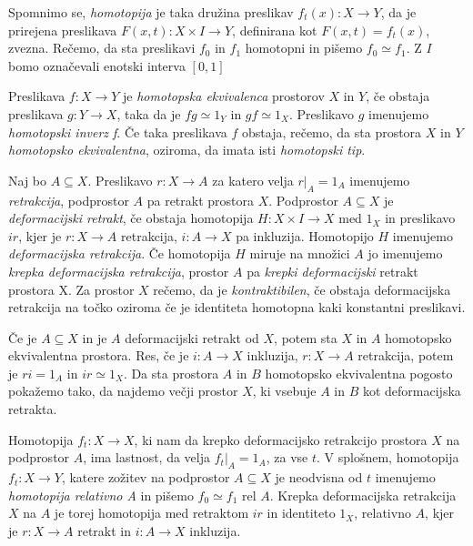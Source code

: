 \documentclass[mat1]{fmfdelo}
\begin{document}
Spomnimo se, \textit{homotopija} je taka družina preslikav $f_t(x)\colon X \rightarrow Y$, da je prirejena preslikava $F(x,t)\colon X \times I \rightarrow Y$, definirana kot $F(x,t)=f_t(x)$, zvezna. Rečemo, da sta preslikavi $f_0$ in $f_1$ homotopni in pišemo $f_0 \simeq f_1$. Z $I$ bomo označevali enotski interva $[0,1]$


\begin{definicija}
    Preslikava  $f \colon  X \rightarrow Y$ je \textit{homotopska ekvivalenca} prostorov $X$ in $Y$, če obstaja preslikava $g\colon  Y\rightarrow X$, taka da
    je $f g \simeq 1_Y$ in $gf \simeq 1_X$. Preslikavo $g$ imenujemo \textit{homotopski inverz f}. Če taka preslikava $f$ obstaja, rečemo, da sta prostora $X$ in
    $Y$  \textit{homotopsko ekvivalentna}, oziroma, da imata isti \textit{homotopski tip}.
\end{definicija}

\begin{definicija}
    Naj bo $A \subseteq X$. Preslikavo $r \colon  X \rightarrow A$ za katero 
    velja $r|_A = 1_A$ imenujemo \textit{retrakcija}, podprostor
     $A$ pa retrakt prostora $X$. Podprostor $A \subseteq X$ je 
     \textit{deformacijski retrakt}, če obstaja homotopija $H \colon  X \times
      I \rightarrow X$ med $1_X$ in preslikavo $ir$, kjer je $r \colon  X 
      \rightarrow A$ retrakcija, $i\colon A\rightarrow X$ pa inkluzija. Homotopijo $H$ imenujemo \textit{deformacijska 
      retrakcija}. Če homotopija $H$ miruje na množici $A$ jo imenujemo 
      \textit{krepka deformacijska retrakcija}, prostor $A$ pa 
      \textit{krepki deformacijski} retrakt prostora X. Za prostor $X$ rečemo, da je \textit{kontraktibilen}, če obstaja deformacijska retrakcija na točko oziroma če je identiteta homotopna kaki konstantni preslikavi.
\end{definicija}

Če je $A\subseteq X$ in je $A$ deformacijski retrakt od $X$, potem sta 
$X$ in $A$ homotopsko ekvivalentna prostora. Res, če je $i\colon A\rightarrow
 X$ inkluzija, $r\colon X\rightarrow A$ retrakcija, potem je $ri=1_A$
  in $ir\simeq1_X$. Da sta prostora $A$ in $B$ homotopsko ekvivalentna pogosto pokažemo tako, da najdemo večji prostor
    $X$, ki vsebuje $A$ in $B$ kot deformacijska retrakta. 

Homotopija $f_t\colon  X\rightarrow X$, ki nam da krepko deformacijsko retrakcijo 
prostora $X$ na podprostor $A$, ima lastnost, da velja 
$f_t|_A=1_A$, za vse $t$. V splošnem, homotopija 
$f_t\colon X\rightarrow Y$, katere zožitev na podprostor $A\subseteq X$ je 
neodvisna od $t$ imenujemo \textit{homotopija relativno A} in pišemo $f_0 \simeq f_1$ rel $A$. Krepka 
deformacijska retrakcija $X$ na $A$ je torej homotopija med retraktom
 $ir$ in identiteto $1_X$, relativno $A$, kjer je $r\colon X\rightarrow A$ retrakt in $i\colon A\rightarrow X$ inkluzija.
\end{document}
